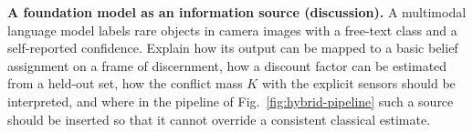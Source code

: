 \begin{prob}\label{prob:ch08:6}
\textbf{A foundation model as an information source (discussion).} A multimodal language model labels rare objects in camera images with a free-text class and a self-reported confidence. Explain how its output can be mapped to a basic belief assignment on a frame of discernment, how a discount factor can be estimated from a held-out set, how the conflict mass $K$ with the explicit sensors should be interpreted, and where in the pipeline of Fig.~\ref{fig:hybrid-pipeline} such a source should be inserted so that it cannot override a consistent classical estimate.
\end{prob}

